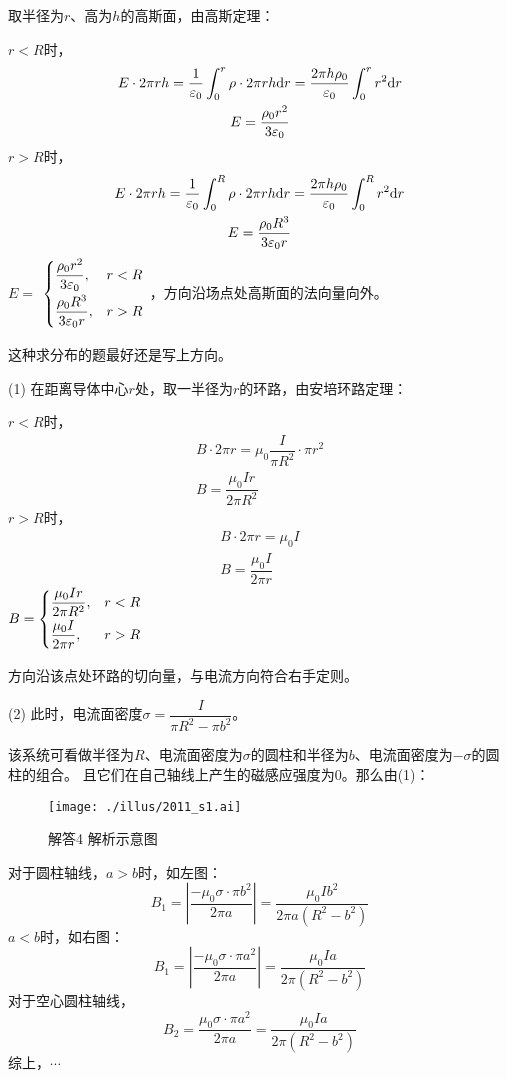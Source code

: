 取半径为$r$、高为$h$的高斯面，由高斯定理：

$r<R$时，
\begin{gather*}
E\cdot 2\pi rh=\dfrac{1}{\varepsilon_0}\int_0^r \rho\cdot 2\pi rh\mathrm{d}r=\dfrac{2\pi h\rho_0}{\varepsilon_0}\int_0^rr^2\mathrm{d}r\\
E=\dfrac{\rho_0r^2}{3\varepsilon_0}
\end{gather*}
$r>R$时，
\begin{gather*}
E\cdot 2\pi rh=\dfrac{1}{\varepsilon_0}\int_0^R \rho\cdot 2\pi rh\mathrm{d}r=\dfrac{2\pi h\rho_0}{\varepsilon_0}\int_0^Rr^2\mathrm{d}r\\
E=\dfrac{\rho_0R^3}{3\varepsilon_0r}
\end{gather*}
\therefore$E=$
$\begin{cases}
\vspace{0.3em}%
\dfrac{\rho_0r^2}{3\varepsilon_0},&r<R\\
\vspace{0.2em}
\dfrac{\rho_0R^3}{3\varepsilon_0r},&r>R
\end{cases}$
，方向沿场点处高斯面的法向量向外。

\note 这种求分布的题最好还是写上方向。

(1) 在距离导体中心$r$处，取一半径为$r$的环路，由安培环路定理：

$r<R$时，
\begin{gather*}
B\cdot 2\pi r=\mu_0\dfrac{I}{\pi R^2}\cdot\pi r^2\\
B=\dfrac{\mu_0Ir}{2\pi R^2}
\end{gather*}
$r>R$时，
\begin{gather*}
B\cdot 2\pi r=\mu_0I\\
B=\dfrac{\mu_0I}{2\pi r}
\end{gather*}
\therefore$B=
\begin{cases}
\vspace{0.3em}
\dfrac{\mu_0Ir}{2\pi R^2},&r<R\\
\vspace{0.2em}
\dfrac{\mu_0I}{2\pi r},&r>R
\end{cases}$

方向沿该点处环路的切向量，与电流方向符合右手定则。

(2) 此时，电流面密度$\sigma=\dfrac{I}{\pi R^2-\pi b^2}$。%

该系统可看做半径为$R$、电流面密度为$\sigma$的圆柱和半径为$b$、电流面密度为$-\sigma$的圆柱的组合。
且它们在自己轴线上产生的磁感应强度为0。那么由(1)：
\begin{figure}
	\centering
	\texttt{[image: ./illus/2011\_s1.ai]}
	\caption{解答4 解析示意图}
\end{figure}
对于圆柱轴线，$a>b$时，如左图：
\[
B_1=\left|\dfrac{-\mu_0\sigma\cdot\pi b^2}{2\pi a}\right|=\dfrac{\mu_0Ib^2}{2\pi a(R^2-b^2)}
\]
$a<b$时，如右图：
\[
B_1=\left|\dfrac{-\mu_0\sigma\cdot\pi a^2}{2\pi a}\right|=\dfrac{\mu_0Ia}{2\pi(R^2-b^2)}
\]
对于空心圆柱轴线，
\[
B_2=\dfrac{\mu_0\sigma\cdot\pi a^2}{2\pi a}=\dfrac{\mu_0Ia}{2\pi(R^2-b^2)}
\]
综上，$\cdots$


